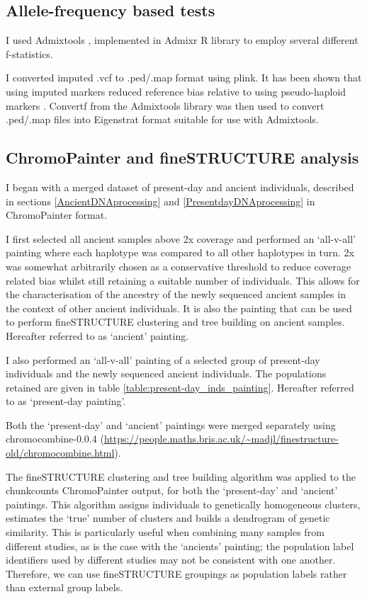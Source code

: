 \subsection{Allele-frequency based tests}

I used Admixtools \cite{Patterson2012}, implemented in Admixr R library \cite{admixrpetr2019} to employ several different f-statistics. 

I converted imputed .vcf to .ped/.map format using plink. It has been shown that using imputed markers reduced reference bias relative to using pseudo-haploid markers \cite{Martiniano2017}. Convertf from the Admixtools library was then used to convert .ped/.map files into Eigenstrat format suitable for use with Admixtools. 

\subsection{ChromoPainter and fineSTRUCTURE analysis}

I began with a merged dataset of present-day and ancient individuals, described in sections \ref{AncientDNAprocessing} and \ref{PresentdayDNAprocessing} in ChromoPainter format. 

I first selected all ancient samples above 2x coverage and performed an `all-v-all' painting where each haplotype was compared to all other haplotypes in turn. 2x was somewhat arbitrarily chosen as a conservative threshold to reduce coverage related bias whilst still retaining a suitable number of individuals. This allows for the characterisation of the ancestry of the newly sequenced ancient samples in the context of other ancient individuals. It is also the painting that can be used to perform fineSTRUCTURE clustering and tree building on ancient samples. Hereafter referred to as `ancient' painting.

I also performed an `all-v-all' painting of a selected group of present-day individuals and the newly sequenced ancient individuals. The populations retained are given in table \ref{table:present-day_inds_painting}. Hereafter referred to as `present-day painting'.

Both the `present-day' and `ancient' paintings were merged separately using chromocombine-0.0.4 (\url{https://people.maths.bris.ac.uk/~madjl/finestructure-old/chromocombine.html}). 

The fineSTRUCTURE \cite{Lawson2012} clustering and tree building algorithm was applied to the chunkcounts ChromoPainter output, for both the `present-day' and `ancient' paintings. This algorithm assigns individuals to genetically homogeneous clusters, estimates the `true' number of clusters and builds a dendrogram of genetic similarity. This is particularly useful when combining many samples from different studies, as is the case with the `ancients' painting; the population label identifiers used by different studies may not be consistent with one another. Therefore, we can use fineSTRUCTURE groupings as population labels rather than external group labels. 

